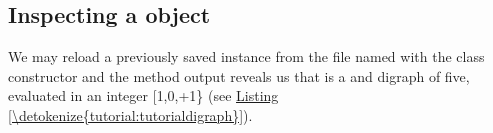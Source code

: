 \documentclass[a4paper,12pt,english]{sphinxhowto}
\begin{document}
\subsection{Inspecting a  object}
\label{\detokenize{tutorial:inspecting-a-digraph-object}}
We may reload a previously saved  instance from the file named  with the  class constructor and the  method output reveals us that  is a  and  digraph of  five, evaluated in an integer  {[}\sphinxhyphen{}1,0,+1\} (see \hyperref[\detokenize{tutorial:tutorialdigraph}]{Listing \ref{\detokenize{tutorial:tutorialdigraph}}}).
\def\sphinxLiteralBlockLabel{\label{\detokenize{tutorial:tutorialdigraph}}}
\end{document}
